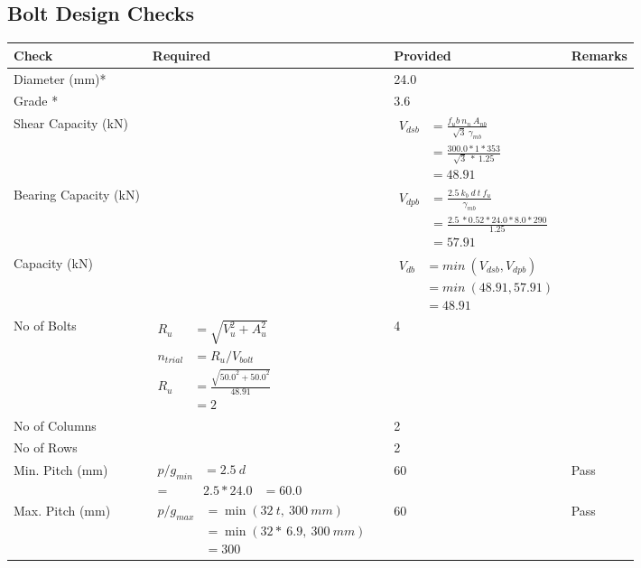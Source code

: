 \documentclass{article}%
\begin{document}
\subsection{Bolt Design Checks}%
\label{subsec:BoltDesignChecks}%
\renewcommand{\arraystretch}{1.2}%
\begin{longtable}{|p{4cm}|p{5cm}|p{5.5cm}|p{1.5cm}|}%
\hline%
\rowcolor{OsdagGreen}%
Check&Required&Provided&Remarks\\%
\hline%
\endhead%
\hline%
Diameter (mm)*&&24.0&\\%
\hline%
Grade *&&3.6&\\%
\hline%
Shear Capacity (kN)&&$\begin{aligned}V_{dsb} &= \frac{f_ub ~n_n~ A_{nb}}{\sqrt{3} ~\gamma_{mb}}\\ &= \frac{300.0*1*353}{\sqrt{3}~*~1.25}\\ &= 48.91\end{aligned}$&\\%
\hline%
Bearing Capacity (kN)&&$\begin{aligned}V_{dpb} &= \frac{2.5~ k_b~ d~ t~ f_u}{\gamma_{mb}}\\ &= \frac{2.5~*0.52*24.0*8.0*290}{1.25}\\ &=57.91\end{aligned}$&\\%
\hline%
Capacity (kN)&&$\begin{aligned}V_{db} &= min~ (V_{dsb}, V_{dpb})\\ &= min~ (48.91,57.91)\\ &=48.91\end{aligned}$&\\%
\hline%
No of Bolts&$\begin{aligned}R_{u} &= \sqrt{V_u^2+A_u^2}\\ n_{trial} &= R_u/ V_{bolt}\\ R_{u} &= \frac{\sqrt{50.0^2+50.0^2}}{48.91}\\ &=2\end{aligned}$&4&\\%
\hline%
No of Columns&&2&\\%
\hline%
No of Rows&&2&\\%
\hline%
Min. Pitch (mm)&$\begin{aligned}p/g_{min}&= 2.5 ~ d&\\ =&2.5*24.0&=60.0\end{aligned}$&60&Pass\\%
\hline%
Max. Pitch (mm)&$\begin{aligned}p/g_{max} &=\min(32~t,~300~mm)&\\ &=\min(32 *~6.9,~ 300 ~mm)\\&=300\end{aligned}$&60&Pass\\%

\end{longtable}
\end{document}
